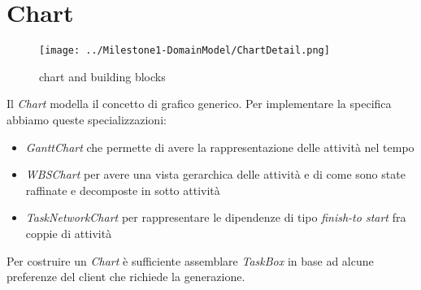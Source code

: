 \section{Chart}
\label{sec:chart}

\begin{figure}[h!] 
	\centering
	\texttt{[image: ../Milestone1-DomainModel/ChartDetail.png]}
	\caption{chart and building blocks}
	\label{fig:chart} 
\end{figure}

Il \emph{Chart} modella il concetto di grafico generico. Per implementare la
specifica abbiamo queste specializzazioni:
\begin{itemize}
  \item \emph{GanttChart} che permette di avere la rappresentazione delle
  attivit\`a nel tempo
  \item \emph{WBSChart} per avere una vista gerarchica delle attivit\`a e di
  come sono state raffinate e decomposte in sotto attivit\`a
  \item \emph{TaskNetworkChart} per rappresentare le dipendenze di tipo
  \emph{finish-to start} fra coppie di attivit\`a
\end{itemize}

Per costruire un \emph{Chart} \`e sufficiente assemblare \emph{TaskBox} in base
ad alcune preferenze del client che richiede la generazione.
